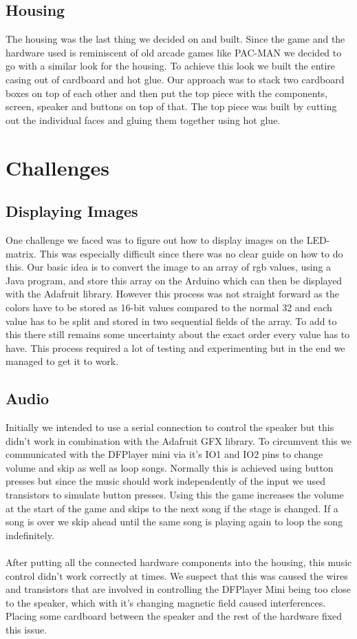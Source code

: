 \documentclass[10pt, a4paper]{article}
\begin{document}
\subsection*{Housing}

The housing was the last thing we decided on and built. Since the game and the hardware used is reminiscent of old arcade games like PAC-MAN we decided to go with a similar look for the housing. To achieve this look we built the entire casing out of cardboard and hot glue. Our approach was to stack two cardboard boxes on top of each other and then put the top piece with the components, screen, speaker and buttons on top of that. The top piece was built by cutting out the individual faces and gluing them together using hot glue.


\section*{Challenges}
\label{sec:challenges}

\subsection*{Displaying Images}
One challenge we faced was to figure out how to display images on the LED-matrix. This was especially difficult since there was no clear guide on how to do this. Our basic idea is to convert the image to an array of rgb values, using a Java program, and store this array on the Arduino which can then be displayed with the Adafruit library. However this process was not straight forward as the colors have to be stored as 16-bit values compared to the normal 32 and each value has to be split and stored in two sequential fields of the array. To add to this there still remains some uncertainty about the exact order every value has to have. This process required a lot of testing and experimenting but in the end we managed to get it to work. 

\subsection*{Audio}
Initially we intended to use a serial connection to control the speaker but this didn't work in combination with the Adafruit GFX library. To circumvent this we communicated with the DFPlayer mini via it's IO1 and IO2 pins to change volume and skip as well as loop songs. Normally this is achieved using button presses but since the music should work independently of the input we used transistors to simulate button presses. Using this the game increases the volume at the start of the game and skips to the next song if the stage is changed. If a song is over we skip ahead until the same song is playing again to loop the song indefinitely. \\\\
After putting all the connected hardware components into the housing, this music control didn't work correctly at times. We suspect that this was caused the wires and transistors that are involved in controlling the DFPlayer Mini being too close to the speaker, which with it's changing magnetic field caused interferences. Placing some cardboard between the speaker and the rest of the hardware fixed this issue. 
\end{document}
